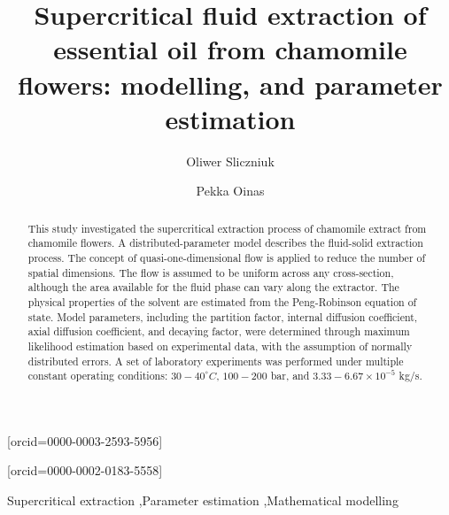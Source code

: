 \documentclass[a4paper,fleqn]{cas-dc}
\begin{document}
 

\title[mode=title]{Supercritical fluid extraction of essential oil from chamomile flowers: modelling, and parameter estimation}                      


\author[1]{Oliwer Sliczniuk}[orcid=0000-0003-2593-5956]
\cormark[1]

\author[1]{Pekka Oinas}[orcid=0000-0002-0183-5558]

\address[1]{Aalto University, School of Chemical Engineering, Espoo, 02150, Finland}


\begin{abstract}
This study investigated the supercritical extraction process of chamomile extract from chamomile flowers. A distributed-parameter model describes the fluid-solid extraction process. The concept of quasi-one-dimensional flow is applied to reduce the number of spatial dimensions. The flow is assumed to be uniform across any cross-section, although the area available for the fluid phase can vary along the extractor. The physical properties of the solvent are estimated from the Peng-Robinson equation of state. Model parameters, including the partition factor, internal diffusion coefficient, axial diffusion coefficient, and decaying factor, were determined through maximum likelihood estimation based on experimental data, with the assumption of normally distributed errors. A set of laboratory experiments was performed under multiple constant operating conditions: $30 - 40^\circ C$, $100 - 200$ bar, and $3.33-6.67 \times 10^{-5}$ kg/s. 

\end{abstract}

\begin{keywords}
Supercritical extraction \sep Parameter estimation \sep Mathematical modelling
\end{keywords}

\maketitle
\end{document}
